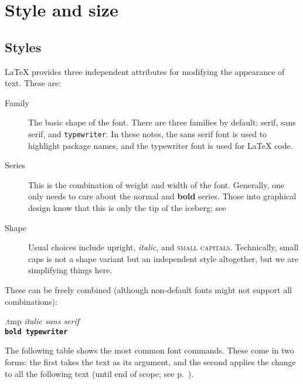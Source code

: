 %
%
%
\section{Style and size}

\subsection{Styles}
\LaTeX{} provides three independent attributes for modifying the appearance of text.
These are:

\begin{description}
\item[Family] The basic shape of the font.
    There are three families by default: serif, \textsf{sans serif}, and \texttt{typewriter}.
    In these notes, the sans serif font is used to highlight package names,
    and the typewriter font is used for \LaTeX{} code.

\item[Series] This is the combination of weight and width of the font.
    Generally, one only needs to care about the normal and \textbf{bold} series.
    Those into graphical design know that this is only the tip of the iceberg;
    see 

\item[Shape] Usual choices include upright, \textit{italic}, and \textsc{small capitals}.
    Technically, small caps is not a shape variant but an independent style altogether,
    but we are simplifying things here.
\end{description}

These can be freely combined (although non-default fonts might not support all combinations):
%
\begin{VerbatimOut}{\jobname.tmp}
\textsf{\textit{italic sans serif}}\\
\textbf{\texttt{bold typewriter}}
\end{VerbatimOut}
\ShowExample

The following table shows the most common font commands.
These come in two forms: the first takes the text as its argument,
and the second applies the change to all the following text
(until end of scope; see p.~\pageref{ex:font scope}).

